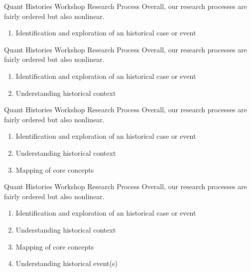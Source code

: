 \documentclass[10pt]{beamer} %
\theoremstyle{plain} %
\theoremstyle{definition} %
\begin{document}
\begin{frame}{\color{Maroon} \small Quant Histories Workshop Research Process}
Overall, our research processes are fairly ordered but also nonlinear.
\vfill
\begin{enumerate}
\item Identification and exploration of an historical case or event
\end{enumerate}
\vfill
\end{frame}

\begin{frame}{\color{Maroon} \small Quant Histories Workshop Research Process}
Overall, our research processes are fairly ordered but also nonlinear.
\vfill
\begin{enumerate}
\item Identification and exploration of an historical case or event
\item Understanding historical context
\end{enumerate}
\vfill
\end{frame}

\begin{frame}{\color{Maroon} \small Quant Histories Workshop Research Process}
Overall, our research processes are fairly ordered but also nonlinear.
\vfill
\begin{enumerate}
\item Identification and exploration of an historical case or event
\item Understanding historical context
\item Mapping of core concepts
\end{enumerate}
\vfill
\end{frame}

\begin{frame}{\color{Maroon} \small Quant Histories Workshop Research Process}
Overall, our research processes are fairly ordered but also nonlinear.
\vfill
\begin{enumerate}
\item Identification and exploration of an historical case or event
\item Understanding historical context
\item Mapping of core concepts
\item Understanding historical event(s)
\end{enumerate}
\vfill
\end{frame}
\end{document}
